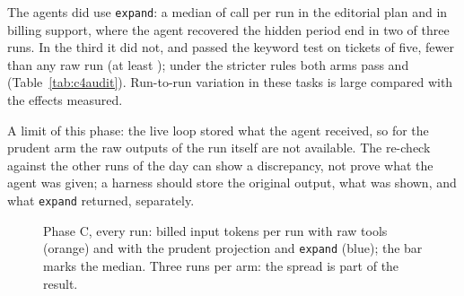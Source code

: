 The agents did use \texttt{expand}: a median of \PhaseCPrudentExpandi{} call per run in the editorial plan and
\PhaseCPrudentExpandiv{} in billing support, where the agent recovered the hidden period end in two of three runs.
In the third it did not, and passed the keyword test on \PhaseCMinRightPrudentiv{} tickets of five, fewer than any
raw run (at least \PhaseCMinRightRawiv); under the stricter rules both arms pass \AuditCFourCPrudent{}
and \AuditCFourCRaw{} (Table~\ref{tab:c4audit}). Run-to-run variation in these tasks is large
compared with the effects measured.

A limit of this phase: the live loop stored what the agent received, so for the prudent arm the raw outputs of the
run itself are not available. The re-check against the other runs of the day can show a discrepancy, not prove what
the agent was given; a harness should store the original output, what was shown, and what \texttt{expand} returned,
separately.

\begin{table}[t]
\centering\small

\caption{Phase C: live runs, raw tools against the prudent projection with \texttt{expand}; medians of three runs.
Input tokens are billed tokens from the API, cache included.}
\label{tab:phasec}
\end{table}

\begin{figure}[t]
\centering

\caption{Phase C, every run: billed input tokens per run with raw tools (orange) and with the prudent projection
and \texttt{expand} (blue); the bar marks the median. Three runs per arm: the spread is part of the result.}
\label{fig:live}
\end{figure}
